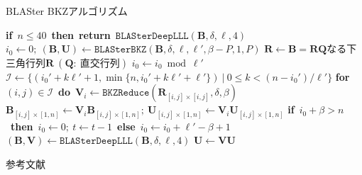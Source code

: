 \documentclass[12pt,aspectratio=169,table,dvipdfmx, leqno]{beamer}
\begin{document}
\begin{frame}

\begin{algorithm}[H]
    \footnotesize
    \begin{algorithmic}[1]
        \caption{\footnotesize BLASter BKZアルゴリズム\cite{DPS25}}
        \label{alg_blaster_bkz}
        \State \textbf{if}~$n\le 40$~\textbf{then}~\textbf{return}~$\texttt{BLASterDeepLLL}(\bm{B}, \delta, \ell, 4)$
        \State $i_0\gets 0;~(\bm{B}, \bm{U})\gets \texttt{BLASterBKZ}(\bm{B}, \delta, \ell, \ell', \beta-P,1, P)$
            \State $\bm{R}\gets \bm{B}=\bm{RQ}$なる下三角行列$\bm{R}~(\bm{Q}:~\text{直交行列})$
            \State $i_0\gets i_0\bmod{\ell'}$
            \State $\mathcal{I}\gets \{(i_0'+k\ell'+1, \min\{n, i_0'+k\ell'+\ell'\})~|~0\le k<(n-i_0')/\ell'\}$
            \textbf{for}~$(i, j)\in\mathcal{I}$~\textbf{do}~$\bm{V}_i\gets \texttt{BKZReduce}(\bm{R}_{[i, j]\times [i, j]}, \delta, \beta)$
                \State $\bm{B}_{[i, j]\times [1, n]}\gets \bm{V}_i\bm{B}_{[i, j]\times [1, n]};~\bm{U}_{[i, j]\times [1, n]}\gets \bm{V}_i\bm{U}_{[i, j]\times [1, n]}$
            \EndFor
            \State \textbf{if}~$i_0+\beta>n$~\textbf{then}~$i_0\gets 0;~t\gets t-1$~\textbf{else}~$i_0\gets i_0+\ell'-\beta+1$
            \State $(\bm{B}, \bm{V})\gets \texttt{BLASterDeepLLL}(\bm{B}, \delta, \ell, 4)$
            \State $\bm{U}\gets\bm{VU}$
        \EndWhile
    \end{algorithmic}
\end{algorithm}
\end{frame}

\begin{frame}[allowframebreaks]{参考文献}
\beamertemplatetextbibitems

\typeout{}

\end{frame}
\end{document}
